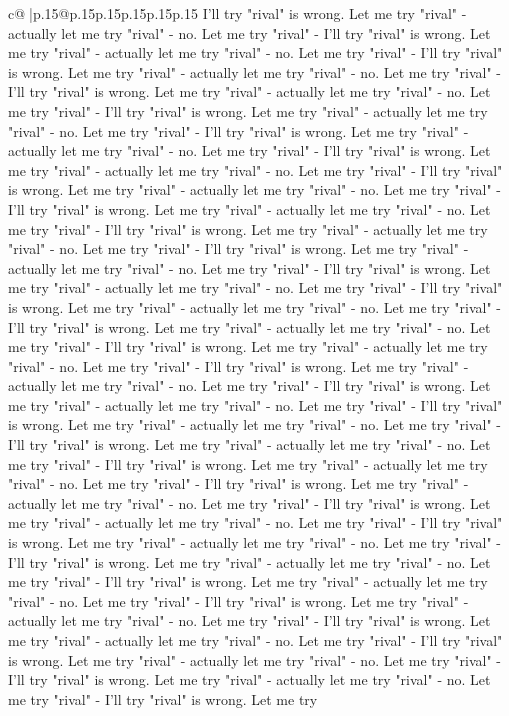 \documentclass{article}
\begin{document}
{\begin{supertabular}{c@{$\;$}|p{.15\linewidth}@{}p{.15\linewidth}p{.15\linewidth}p{.15\linewidth}p{.15\linewidth}p{.15\linewidth}}
{{{I'll try "rival" is wrong. Let me try "rival" {-} actually let me try "rival" {-} no. Let me try "rival" {-} I'll try "rival" is wrong. Let me try "rival" {-} actually let me try "rival" {-} no. Let me try "rival" {-} I'll try "rival" is wrong. Let me try "rival" {-} actually let me try "rival" {-} no. Let me try "rival" {-} I'll try "rival" is wrong. Let me try "rival" {-} actually let me try "rival" {-} no. Let me try "rival" {-} I'll try "rival" is wrong. Let me try "rival" {-} actually let me try "rival" {-} no. Let me try "rival" {-} I'll try "rival" is wrong. Let me try "rival" {-} actually let me try "rival" {-} no. Let me try "rival" {-} I'll try "rival" is wrong. Let me try "rival" {-} actually let me try "rival" {-} no. Let me try "rival" {-} I'll try "rival" is wrong. Let me try "rival" {-} actually let me try "rival" {-} no. Let me try "rival" {-} I'll try "rival" is wrong. Let me try "rival" {-} actually let me try "rival" {-} no. Let me try "rival" {-} I'll try "rival" is wrong. Let me try "rival" {-} actually let me try "rival" {-} no. Let me try "rival" {-} I'll try "rival" is wrong. Let me try "rival" {-} actually let me try "rival" {-} no. Let me try "rival" {-} I'll try "rival" is wrong. Let me try "rival" {-} actually let me try "rival" {-} no. Let me try "rival" {-} I'll try "rival" is wrong. Let me try "rival" {-} actually let me try "rival" {-} no. Let me try "rival" {-} I'll try "rival" is wrong. Let me try "rival" {-} actually let me try "rival" {-} no. Let me try "rival" {-} I'll try "rival" is wrong. Let me try "rival" {-} actually let me try "rival" {-} no. Let me try "rival" {-} I'll try "rival" is wrong. Let me try "rival" {-} actually let me try "rival" {-} no. Let me try "rival" {-} I'll try "rival" is wrong. Let me try "rival" {-} actually let me try "rival" {-} no. Let me try "rival" {-} I'll try "rival" is wrong. Let me try "rival" {-} actually let me try "rival" {-} no. Let me try "rival" {-} I'll try "rival" is wrong. Let me try "rival" {-} actually let me try "rival" {-} no. Let me try "rival" {-} I'll try "rival" is wrong. Let me try "rival" {-} actually let me try "rival" {-} no. Let me try "rival" {-} I'll try "rival" is wrong. Let me try "rival" {-} actually let me try "rival" {-} no. Let me try "rival" {-} I'll try "rival" is wrong. Let me try "rival" {-} actually let me try "rival" {-} no. Let me try "rival" {-} I'll try "rival" is wrong. Let me try "rival" {-} actually let me try "rival" {-} no. Let me try "rival" {-} I'll try "rival" is wrong. Let me try "rival" {-} actually let me try "rival" {-} no. Let me try "rival" {-} I'll try "rival" is wrong. Let me try "rival" {-} actually let me try "rival" {-} no. Let me try "rival" {-} I'll try "rival" is wrong. Let me try "rival" {-} actually let me try "rival" {-} no. Let me try "rival" {-} I'll try "rival" is wrong. Let me try "rival" {-} actually let me try "rival" {-} no. Let me try "rival" {-} I'll try "rival" is wrong. Let me try "rival" {-} actually let me try "rival" {-} no. Let me try "rival" {-} I'll try "rival" is wrong. Let me try "rival" {-} actually let me try "rival" {-} no. Let me try "rival" {-} I'll try "rival" is wrong. Let me try }}}
\end{supertabular}}
\end{document}
